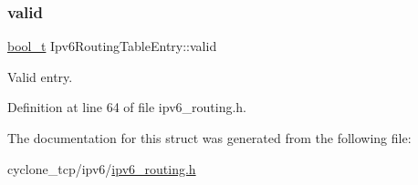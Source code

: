 \subsubsection{\texorpdfstring{valid}{valid}}
{\footnotesize\ttfamily \hyperlink{compiler__port_8h_a812d16e5494522586b3784e55d479912}{bool\+\_\+t} Ipv6\+Routing\+Table\+Entry\+::valid}



Valid entry. 



Definition at line 64 of file ipv6\+\_\+routing.\+h.



The documentation for this struct was generated from the following file\+:\begin{DoxyCompactItemize}
\item 
cyclone\+\_\+tcp/ipv6/\hyperlink{ipv6__routing_8h}{ipv6\+\_\+routing.\+h}\end{DoxyCompactItemize}
